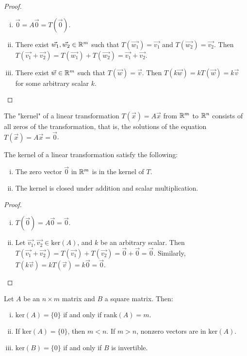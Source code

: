 \documentclass[a4paper,11pt]{article}
\begin{document}
\begin{outline}
    \begin{proof}
      \begin{enumerate}[i.]
        \item
          \(\vec{0} = A\vec{0} = T(\vec{0})\).
        \item
          There exist \(\vec{w_1}, \vec{w_2} \in \mathbb{R}^m\) such that \(T(\vec{w_1}) = \vec{v_1}\) and
          \(T(\vec{w_2}) = \vec{v_2}\). Then \(T(\vec{v_1} + \vec{v_2}) = T(\vec{w_1}) + T(\vec{w_2}) =
          \vec{v_1} + \vec{v_2}\).
        \item
          There exist \(\vec{w} \in \mathbb{R}^m\) such that \(T(\vec{w}) = \vec{v}\). Then \(T(k\vec{w}) =
          kT(\vec{w}) = k\vec{v}\) for some arbitrary scalar \(k\).
      \end{enumerate}
    \end{proof}

    The "kernel" of a linear transformation \(T(\vec{x}) = A\vec{x}\) from \(\mathbb{R}^m\) to \(\mathbb{R}^n\)
    consists of all zeros of the transformation, that is, the solutions of the equation \(T(\vec{x}) = A\vec{x}
    = \vec{0}\).
    
    The kernel of a linear transformation satisfy the following:
    \begin{enumerate}[i.]
      \item
        The zero vector \(\vec{0}\) in \(\mathbb{R}^m\) is in the kernel of \(T\).
      \item
        The kernel is closed under addition and scalar multiplication.
    \end{enumerate}

    \begin{proof}
      \begin{enumerate}[i.]
        \item
          \(T(\vec{0}) = A\vec{0} = \vec{0}\).
        \item
          Let \(\vec{v_1}, \vec{v_2} \in \text{ker}(A)\), and \(k\) be an arbitrary scalar. Then \(T(\vec{v_1}
          + \vec{v_2}) = T(\vec{v_1}) + T(\vec{v_2}) = \vec{0} + \vec{0} = \vec{0}\). Similarly, \(T(k\vec{v}) 
          = kT(\vec{v}) = k\vec{0} = \vec{0}\).
      \end{enumerate}
    \end{proof}
    
    Let \(A\) be an \(n \times m\) matrix and \(B\) a square matrix. Then:
    \begin{enumerate}[i.]
      \item \(\text{ker}(A) = \{0\}\) if and only if \(\text{rank}(A) = m\).
      \item If \(\text{ker}(A) = \{0\}\), then \(m < n\). If \(m > n\), nonzero vectors are in \(\text{ker}(A)\).
      \item \(\text{ker}(B) = \{0\}\) if and only if \(B\) is invertible.
    \end{enumerate}
    

\end{outline}
\end{document}
